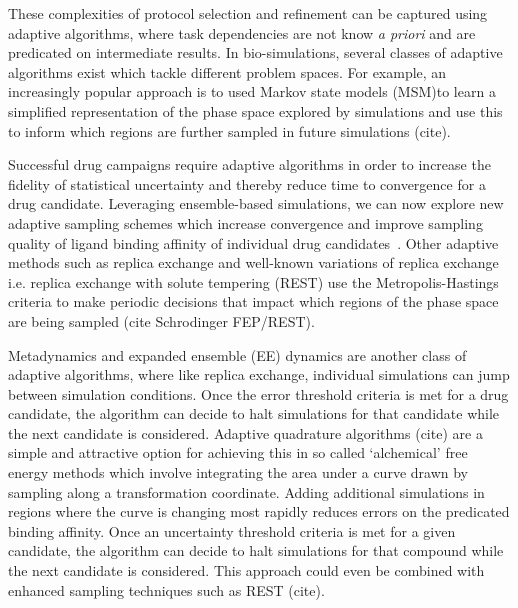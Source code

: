 These complexities of protocol selection and refinement can be captured using 
adaptive algorithms, where task  dependencies are not know 
\textit{a priori} and are predicated on intermediate results. 
In bio-simulations, several classes of adaptive algorithms exist which tackle 
different problem spaces. 
For example, an increasingly popular approach is to used Markov state models 
(MSM)to learn a simplified representation of the phase space explored by 
simulations and use this to inform which regions are further sampled in 
future simulations (cite). 

Successful drug campaigns require adaptive algorithms in order to increase 
the fidelity of statistical uncertainty and thereby reduce time to convergence 
for a drug candidate. Leveraging ensemble-based simulations, we can now explore 
new adaptive sampling schemes which increase convergence and improve 
sampling quality of ligand binding affinity of individual drug 
candidates~\cite{DeFabritiis2014}. Other adaptive methods such as replica 
exchange and well-known variations of replica exchange i.e. replica exchange 
with solute tempering (REST) use the Metropolis-Hastings criteria to make 
periodic decisions that impact which regions of the phase space are being 
sampled (cite Schrodinger FEP/REST).

Metadynamics and expanded ensemble (EE) dynamics are another class of 
adaptive algorithms, where like replica exchange, individual simulations 
can jump between simulation conditions. Once the error threshold 
criteria is met for a drug candidate, the algorithm can decide to halt 
simulations for that candidate while the next candidate is considered. 
Adaptive quadrature algorithms (cite) are a simple and attractive option for 
achieving this in so called `alchemical' free energy methods which involve 
integrating the area under a curve drawn by sampling along a transformation 
coordinate. Adding additional simulations in regions where the curve is 
changing most rapidly reduces errors on the predicated binding affinity. 
Once an uncertainty threshold criteria is met for a given candidate, the 
algorithm can decide to halt simulations for that compound while the next 
candidate is considered. This approach could even be combined with enhanced 
sampling techniques such as REST (cite).

